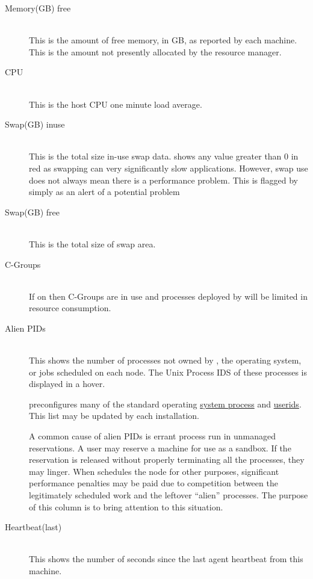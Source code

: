 \begin{description}
      \item[Memory(GB) free] \hfill \\
        This is the amount of free memory, in GB, as reported by each machine.
        This is the amount not presently allocated by the resource manager.
        
      \item[CPU] \hfill \\
        This is the host CPU one minute load average.
        
      \item[Swap(GB) inuse] \hfill \\
        This is the total size in-use swap data.  {\DUCC} shows any value greater than 0 in
        red as swapping can very significantly slow applications.  However, swap use does
        not always mean there is a performance problem.  This is flagged by {\DUCC} simply
        as an alert of a potential problem

      \item[Swap(GB) free] \hfill \\
        This is the total size of swap area.  

      \item[C-Groups] \hfill \\
        If on then C-Groups are in use and processes deployed by {\DUCC} will
        be limited in resource consumption.


      \item[Alien PIDs] \hfill \\
        This shows the number of processes not owned by {\DUCC}, the operating system, or
        jobs scheduled on each node.  The Unix Process IDS of these processes is displayed
        in a hover.

        {\DUCC} preconfigures many of the standard operating 
        \hyperref[itm:props-rogue.process]{system process} and 
        \hyperref[itm:props-rogue.user]{userids}.  This list may be updated by each
        installation.

        A common cause of alien PIDs is errant process run in unmanaged reservations.  A
        user may reserve a machine for use as a sandbox.  If the reservation is released
        without properly terminating all the processes, they may linger.  When {\DUCC} 
        schedules the node for other purposes, significant performance penalties may be
        paid due to competition between the legitimately scheduled work and the leftover
        ``alien'' processes.  The purpose of this column is to bring attention to this situation.


      \item[Heartbeat(last)] \hfill \\
        This shows the number of seconds since the last agent heartbeat from this machine.

      \end{description}
      
